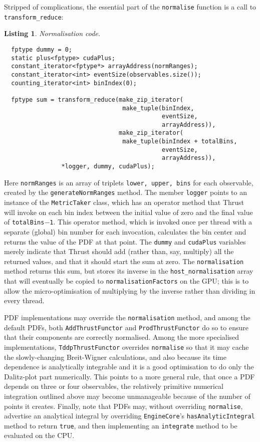 \documentclass[12pt,pdflatex]{article}
\newtheorem{listing}{Listing}
\begin{document}
Stripped of complications, the essential part of the \texttt{normalise} function
is a call to \texttt{transform\_reduce}:
\begin{listing}
\label{listing:normalisation}
Normalisation code.

\begin{verbatim}
  fptype dummy = 0; 
  static plus<fptype> cudaPlus;
  constant_iterator<fptype*> arrayAddress(normRanges); 
  constant_iterator<int> eventSize(observables.size());
  counting_iterator<int> binIndex(0); 

  fptype sum = transform_reduce(make_zip_iterator(
                                 make_tuple(binIndex, 
                                            eventSize, 
                                            arrayAddress)),
                                make_zip_iterator(
                                 make_tuple(binIndex + totalBins, 
                                            eventSize, 
                                            arrayAddress)),
				*logger, dummy, cudaPlus); 
\end{verbatim}
\end{listing}
Here \texttt{normRanges} is an array of triplets \verb|lower, upper, bins| for each observable, created
by the \texttt{generateNormRanges} method. The member \texttt{logger} points to an instance of the
\texttt{MetricTaker} class, which has an operator method that Thrust will invoke on each bin index between
the initial value of zero and the final value of \texttt{totalBins$-$1}. This operator method, which is invoked once per
thread with a separate (global) bin number for each invocation, calculates
the bin center and returns the value of the PDF at that point.
The \texttt{dummy} and \texttt{cudaPlus} variables
merely indicate that Thrust should add (rather than, say, multiply) all the returned
values, and that it should start the sum at zero. The \texttt{normalisation} method
returns this sum, but stores its inverse in the \texttt{host\_normalisation} array
that will eventually be copied to \texttt{normalisationFactors} on the GPU; this is to allow the micro-optimisation of 
multiplying by the inverse rather than dividing in every thread. 

PDF implementations may override the \texttt{normalisation} method, and among the default
PDFs, both \texttt{AddThrustFunctor} and \texttt{ProdThrustFunctor} do so to
ensure that their components are correctly normalised. Among the more specialised
implementations, \texttt{TddpThrustFunctor} overrides \texttt{normalise} so that
it may cache the slowly-changing Breit-Wigner calculations, and also because its time dependence
is analytically integrable and it is a good optimisation to do only the Dalitz-plot
part numerically. This points to a more general rule, that once a PDF depends on three
or four observables, the relatively primitive numerical integration outlined above may
become unmanageable because of the number of points it creates. Finally, note that PDFs
may, without overriding \texttt{normalise}, advertise an analytical integral by overriding
\texttt{EngineCore}'s \texttt{hasAnalyticIntegral} method to return \texttt{true}, 
and then implementing an \texttt{integrate} method to be evaluated on the CPU. 
\end{document}
